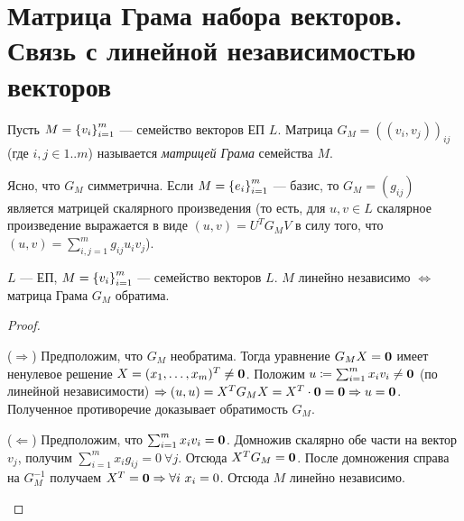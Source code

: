 \section{Матрица Грама набора векторов. Связь с линейной независимостью векторов}

\begin{defn}
    Пусть $M = \left\{v_i\right\}_{i=1}^{m}$ --- семейство векторов ЕП $L$. Матрица $G_M = ((v_i, v_j))_{ij}$ (где $i, j \in 1..m$) называется \textit{матрицей Грама} семейства $M$.
\end{defn}

\begin{rem}
    Ясно, что $G_M$ симметрична. Если $M = \left\{e_i\right\}_{i=1}^{m}$ --- базис, то $G_M = (g_{ij})$ является матрицей скалярного произведения (то есть, для $u, v \in L$ скалярное произведение выражается в виде $(u, v) = U^TG_MV$ в силу того, что $(u, v) = \sum_{i, j = 1}^m g_{ij} u_i v_j$).
\end{rem}

\begin{thm*}
    $L$ --- ЕП, $M = \left\{v_i\right\}_{i=1}^{m}$ --- семейство векторов $L$. $M$ линейно независимо $\Leftrightarrow$ матрица Грама $G_M$ обратима.
\end{thm*}

\begin{proof}
    \begin{proofpart}{($\Rightarrow$)}
        Предположим, что $G_M$ необратима. Тогда уравнение $G_M X = \mathbf{0}$ имеет ненулевое решение $X = (x_1, \ldots, x_m)^T \neq \mathbf{0}$. Положим $u \coloneqq \sum_{i=1}^m x_i v_i \neq \mathbf{0}$ (по линейной независимости) $\Rightarrow (u, u) = X^T G_M X = X^T \cdot \mathbf{0} = \mathbf{0} \Rightarrow u = \mathbf{0}$. Полученное противоречие доказывает обратимость $G_M$.
    \end{proofpart}

    \begin{proofpart}{($\Leftarrow$)}
        Предположим, что $\sum_{i=1}^m x_i v_i = \mathbf{0}$. Домножив скалярно обе части на вектор $v_j$, получим $\sum_{i=1}^m x_i g_{ij} = 0\ \forall j$. Отсюда $X^T G_M = \mathbf{0}$. После домножения справа на $G_M^{-1}$ получаем $X^T = \nil \Rightarrow \forall i\ x_i = 0$. Отсюда $M$ линейно независимо.
    \end{proofpart}
\end{proof}